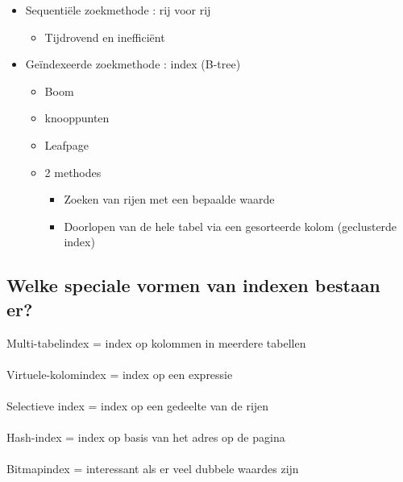\begin{itemize}
\item Sequentiële zoekmethode : rij voor rij
    \begin{itemize}
        \item Tijdrovend en inefficiënt
    \end{itemize}
\item Geïndexeerde zoekmethode : index (B-tree)
    \begin{itemize}
        \item Boom
        \item knooppunten
        \item Leafpage
        \item 2 methodes
            \begin{itemize}
            \item Zoeken van rijen met een bepaalde waarde
            \item	Doorlopen van de hele tabel via een gesorteerde kolom (geclusterde index)
             \end{itemize}
    \end{itemize}
\end{itemize}


\subsection{Welke speciale vormen van indexen bestaan er?}

Multi-tabelindex = index op kolommen in meerdere tabellen\\\\
Virtuele-kolomindex = index op een expressie\\\\
Selectieve index = index op een gedeelte van de rijen\\\\
Hash-index = index op basis van het adres op de pagina\\\\
Bitmapindex = interessant als er veel dubbele waardes zijn